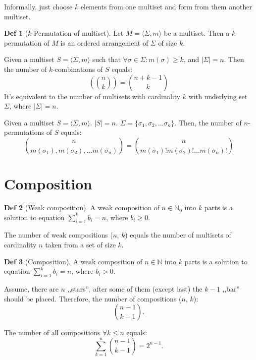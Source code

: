 \documentclass[a4paper]{article}
\theoremstyle{definition}
\newtheorem{definition}{Def}
\begin{document}
Informally, just choose \(k\) elements from one multiset
and form from them another multiset.

\begin{definition}[\(k\)-Permutation of multiset]
  Let \(M = \langle \Sigma, m \rangle\) be a multiset.
  Then a \(k\)-permutation of \(M\)
  is an ordered arrangement of \(\Sigma\) of size \(k\).
\end{definition}

Given a multiset \(S = \langle \Sigma, m \rangle\) such that
\(\forall \sigma \in \Sigma : m(\sigma) \ge k\),
and \(|\Sigma| = n\).
Then the number of \(k\)-combinations of \(S\) equals:
\[\left(\binom{n}{k}\right) = \binom{n + k - 1}{k}\]
It's equivalent to the number of multisets with cardinality \(k\)
with underlying set \(\Sigma\), where \(|\Sigma| = n\).

Given a multiset \(S = \langle \Sigma, m \rangle\).
\(|S| = n\).
\(\Sigma = \{\sigma_1, \sigma_2, \ldots \sigma_n\}\).
Then, the number of \(n\)-permutations of \(S\) equals:
\[ \binom{n}{m(\sigma_1), m(\sigma_2), \ldots m(\sigma_n)}
  = \binom{n}{m(\sigma_1)! m(\sigma_2)! \ldots m(\sigma_n)!} \]

\section{Composition}

\begin{definition}[Weak composition]
  A weak composition of \(n \in \mathbb{N}_0\) into \(k\) parts
  is a solution to equation \(\sum_{i = 1}^{k} b_i = n\), where
  \(b_i \ge 0\).
\end{definition}

The number of weak compositions (\(n\), \(k\))
equals the number of multisets of cardinality \(n\) taken
from a set of size \(k\).

\begin{definition}[Composition]
  A weak composition of \(n \in \mathbb{N}\) into \(k\) parts
  is a solution to equation \(\sum_{i = 1}^{k} b_i = n\), where
  \(b_i > 0\).
\end{definition}

Assume, there are \(n\) ,,stars'', after some of them (except last)
the \(k - 1\) ,,bar'' should be placed.
Therefore, the number of compositions (\(n\), \(k\)):
\[
  \binom{n - 1}{k - 1}
.\]

The number of all compositions \(\forall k \le n\) equals:
\[
  \sum_{k = 1}^{n} \binom{n - 1}{k - 1} = 2^{n - 1}
.\]
\end{document}
